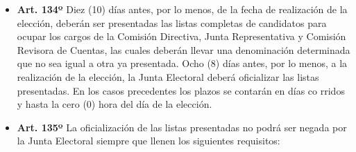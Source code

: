 \documentclass[]{book}
\providecommand{\tightlist}{%
  \setlength{\itemsep}{0pt}\setlength{\parskip}{0pt}}
\begin{document}
\begin{itemize}
\tightlist
\item
  \textbf{Art. 134º} Diez (10) días antes, por lo menos, de la fecha de
  realización de la elección, deberán ser presentadas las listas
  completas de candidatos para ocupar los cargos de la Comisión
  Directiva, Junta Representativa y Comisión Revisora de Cuentas, las
  cuales deberán llevar una denominación determinada que no sea igual a
  otra ya presentada. Ocho (8) días antes, por lo menos, a la
  realización de la elección, la Junta Electoral deberá oficializar las
  listas presentadas. En los casos precedentes los plazos se contarán en
  días co rridos y hasta la cero (0) hora del día de la elección.
\end{itemize}

\begin{itemize}
\item
  \textbf{Art. 135º} La oficialización de las listas presentadas no
  podrá ser negada por la Junta Electoral siempre que llenen los
  siguientes requisitos:


\end{itemize}
\end{document}
